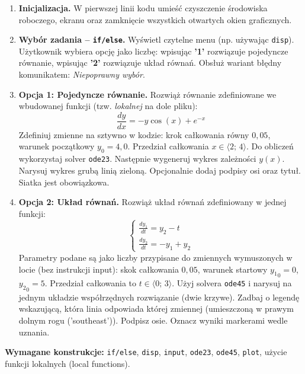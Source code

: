 \documentclass[a4paper,11pt]{article}
\begin{document}
\begin{enumerate}[leftmargin=*, label=\textbf{\arabic*.}, itemsep=2pt]

  \item \textbf{Inicjalizacja.}
    W pierwszej linii kodu umieść czyszczenie środowiska roboczego, ekranu oraz zamknięcie wszystkich otwartych okien graficznych.

  \item \textbf{Wybór zadania -- \texttt{if/else}.}
    Wyświetl czytelne menu (np. używając \texttt{disp}). Użytkownik wybiera opcję jako liczbę: wpisując \textbf{'1'} rozwiązuje pojedyncze równanie, wpisując \textbf{'2'} rozwiązuje układ równań. Obsłuż wariant błędny komunikatem: \textit{Niepoprawny wybór}.

  \item \textbf{Opcja 1: Pojedyncze równanie.}
    Rozwiąż równanie zdefiniowane we wbudowanej funkcji (tzw. \textit{lokalnej} na dole pliku):
    \[ \frac{dy}{dx} = -y\cos(x) + e^{-x} \]
    Zdefiniuj zmienne na sztywno w kodzie: krok całkowania równy $0{,}05$, warunek początkowy $y_0 = 4{,}0$. Przedział całkowania $x \in \langle 2;\,4 \rangle$.
    Do obliczeń wykorzystaj solver \texttt{ode23}. Następnie wygeneruj wykres zależności $y(x)$. Narysuj wykres grubą linią zieloną. Opcjonalnie dodaj podpisy osi oraz tytuł. Siatka jest obowiązkowa.

  \item \textbf{Opcja 2: Układ równań.}
    Rozwiąż układ równań zdefiniowany w jednej funkcji:\\[-0.5em]
    \[
    \begin{cases}
      \frac{dy_1}{dt} = y_2 - t \\
      \frac{dy_2}{dt} = -y_1 + y_2
    \end{cases}
    \]
    Parametry podane są jako liczby przypisane do zmiennych wymuszonych w locie (bez instrukcji input): skok całkowania $0{,}05$, warunek startowy $ {y_1}_{0} = 0 $, $ {y_2}_{0} = 5 $. Przedział całkowania to $t \in \langle 0;\,3 \rangle$.
    Użyj solvera \texttt{ode45} i narysuj na jednym układzie współrzędnych rozwiązanie (dwie krzywe). Zadbaj o legendę wskazującą, która linia odpowiada której zmiennej (umieszczoną w prawym dolnym rogu ('southeast')). Podpisz osie. Oznacz wyniki markerami wedle uznania.

\end{enumerate}

\vspace{0.3cm}
\begin{ramka}
\textbf{Wymagane konstrukcje:}
\texttt{if/else}, \texttt{disp}, \texttt{input}, \texttt{ode23}, \texttt{ode45}, \texttt{plot}, użycie funkcji lokalnych (local functions).
\end{ramka}
\end{document}
